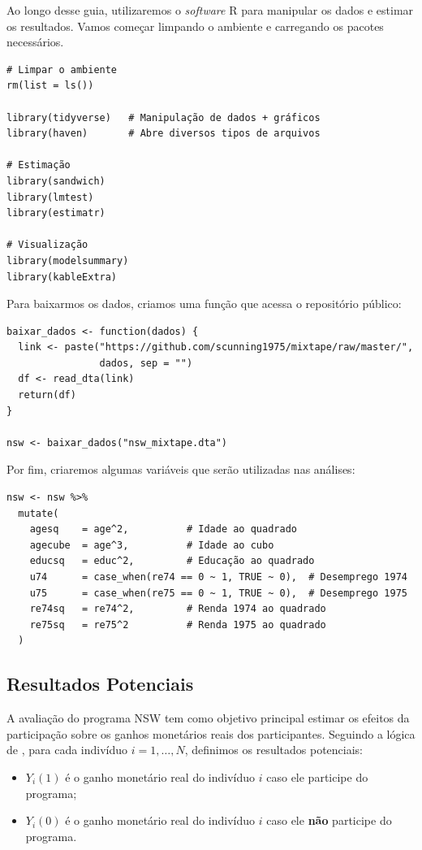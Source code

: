 \documentclass[12pt,a4paper]{article}
\begin{document}
Ao longo desse guia, utilizaremos o \textit{software} R para manipular os dados e estimar os resultados. Vamos começar limpando o ambiente e carregando os pacotes necessários.

\begin{lstlisting}[style=Rstyle]
# Limpar o ambiente
rm(list = ls())

library(tidyverse)   # Manipulação de dados + gráficos
library(haven)       # Abre diversos tipos de arquivos

# Estimação
library(sandwich)
library(lmtest)
library(estimatr)

# Visualização
library(modelsummary)
library(kableExtra)
\end{lstlisting}

Para baixarmos os dados, criamos uma função que acessa o repositório público:

\begin{lstlisting}[style=Rstyle]
baixar_dados <- function(dados) {
  link <- paste("https://github.com/scunning1975/mixtape/raw/master/",
                dados, sep = "")
  df <- read_dta(link)
  return(df)
}

nsw <- baixar_dados("nsw_mixtape.dta")
\end{lstlisting}

Por fim, criaremos algumas variáveis que serão utilizadas nas análises:

\begin{lstlisting}[style=Rstyle]
nsw <- nsw %>%
  mutate(
    agesq    = age^2,          # Idade ao quadrado
    agecube  = age^3,          # Idade ao cubo
    educsq   = educ^2,         # Educação ao quadrado
    u74      = case_when(re74 == 0 ~ 1, TRUE ~ 0),  # Desemprego 1974
    u75      = case_when(re75 == 0 ~ 1, TRUE ~ 0),  # Desemprego 1975
    re74sq   = re74^2,         # Renda 1974 ao quadrado
    re75sq   = re75^2          # Renda 1975 ao quadrado
  )
\end{lstlisting}

\subsection{Resultados Potenciais}\label{sec:po}

A avaliação do programa NSW tem como objetivo principal estimar os efeitos da participação sobre os ganhos monetários reais dos participantes. Seguindo a lógica de \citet{ImbensRubin2015}, para cada indivíduo $i = 1,\dots,N$, definimos os resultados potenciais:

\begin{itemize}
    \item $Y_i(1)$ é o ganho monetário real do indivíduo $i$ caso ele participe do programa;
    \item $Y_i(0)$ é o ganho monetário real do indivíduo $i$ caso ele \textbf{não} participe do programa.
\end{itemize}
\end{document}
